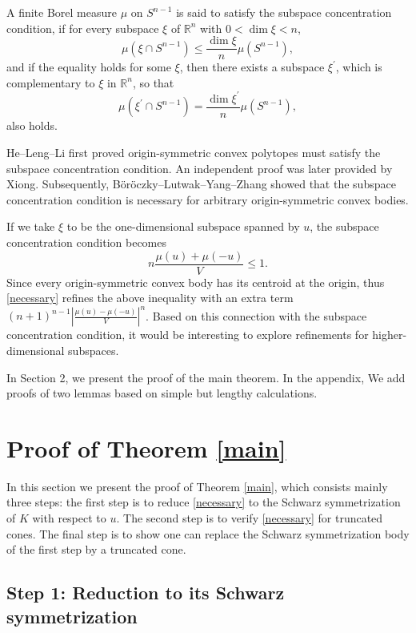 \documentclass[12pt]{amsart}
\numberwithin{equation}{section}
\numberwithin{lemma}{section}
\numberwithin{proposition}{section}
\numberwithin{corollary}{section}
\numberwithin{remark}{section}
\begin{document}
A finite Borel measure $\mu$ on $S^{n-1}$ is said to satisfy the subspace concentration condition, if for every subspace $\xi$ of $\mathbb{R}^n$ with $0<\operatorname{dim} \xi<n$, 
$$
\mu\left(\xi \cap S^{n-1}\right) \leq \frac{\operatorname{dim} \xi}{n} \mu\left(S^{n-1}\right),
$$
and if the equality holds for some $\xi$, then there exists a subspace $\xi^{\prime}$, which is complementary to $\xi$ in $\mathbb{R}^n$, so that 
$$
\mu\left(\xi^{\prime} \cap S^{n-1}\right)=\frac{\operatorname{dim} \xi^{\prime}}{n} \mu\left(S^{n-1}\right) ,
$$
also holds. 

He–Leng–Li\cite{HLL} first proved origin-symmetric convex polytopes must satisfy the subspace concentration condition. An independent proof was later provided by Xiong\cite{Xi}. Subsequently, Böröczky–Lutwak–Yang–Zhang\cite{BLYZ} showed that the subspace concentration condition is necessary for arbitrary origin-symmetric convex bodies.

If we take $\xi$ to be the one-dimensional subspace spanned by $u$, the subspace concentration condition becomes 
\[
n \frac{\mu(u)+\mu(-u)}{V}\leq 1. 
\]
Since every origin-symmetric convex body has its centroid at the origin, thus \eqref{necessary} refines the above inequality with an extra term $(n+1)^{n-1} |\frac{\mu(u)-\mu(-u)}{V}|^n$. Based on this connection with the subspace concentration condition, it would be interesting to explore refinements for higher-dimensional subspaces. 

In Section 2, we present the proof of the main theorem. In the appendix, We add proofs of two lemmas based on simple but lengthy calculations. 

\section{Proof of Theorem \ref{main}}


In this section we present the proof of Theorem \ref{main}, which consists mainly three steps: the first step is to reduce  \eqref{necessary} to the Schwarz symmetrization of $K$ with respect to $u$. The second step is to  verify  \eqref{necessary} for truncated cones. The final step is to show one can replace the Schwarz symmetrization body of the first step by a truncated cone. 

\subsection{Step 1: Reduction to its Schwarz symmetrization}
\ 
\end{document}
